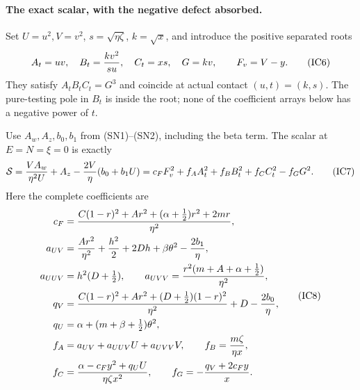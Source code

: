 \paragraph{The exact scalar, with the negative defect absorbed.}
Set $U=u^2,V=v^2$, $s=\sqrt{\eta\zeta}$, $k=\sqrt x$, and introduce
the positive separated roots
\[
 A_t=uv,\quad B_t={k v^2\over s u},\quad
 C_t=xs,\quad G=kv,\qquad F_v=V-y.
                                                               \tag{IC6}
\]
They satisfy $A_tB_tC_t=G^3$ and coincide at actual contact
$(u,t)=(k,s)$. The pure-testing pole in $B_t$ is inside the root;
none of the coefficient arrays below has a negative power of $t$.

Use $A_w,A_z,b_0,b_1$ from (SN1)--(SN2), including the beta term.
The scalar at $E=N=\xi=0$ is exactly
\[
 \mathcal S={VA_w\over\eta^2U}+A_z
                  -{2V\over\eta}(b_0+b_1U)
       =c_FF_v^2+f_AA_t^2+f_BB_t^2+f_CC_t^2-f_GG^2.    \tag{IC7}
\]
Here the complete coefficients are
\[
\begin{aligned}
 c_F={}&{C(1-r)^2+Ar^2+(\alpha+\tfrac12)r^2+2mr\over\eta^2},\\
 a_{UV}={}&{Ar^2\over\eta^2}+{h^2\over2}+2Dh+\beta\theta^2
                                     -{2b_1\over\eta},\\
 a_{UUV}={}&h^2(D+\tfrac12),\qquad
 a_{UVV}={r^2(m+A+\alpha+\tfrac12)\over\eta^2},\\
 q_V={}&{C(1-r)^2+Ar^2+(D+\tfrac12)(1-r)^2\over\eta^2}
                                     +D-{2b_0\over\eta},\\
 q_U={}&\alpha+(m+\beta+\tfrac12)\theta^2,\\
 f_A={}&a_{UV}+a_{UUV}U+a_{UVV}V,\qquad
 f_B={m\zeta\over\eta x},\\
 f_C={}&{\alpha-c_Fy^2+q_UU\over\eta\zeta x^2},\qquad
 f_G=-{q_V+2c_Fy\over x}.                              \end{aligned} \tag{IC8}
\]

